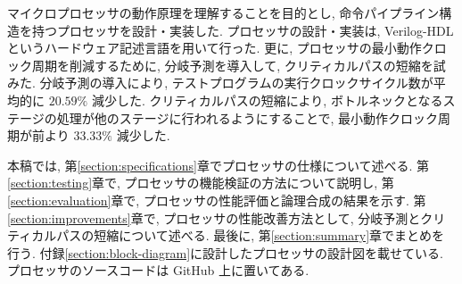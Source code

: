 \documentclass[../main.tex]{subfiles}
\begin{document}
  マイクロプロセッサの動作原理を理解することを目的とし, 
  命令パイプライン構造を持つプロセッサを設計・実装した.
  プロセッサの設計・実装は, Verilog-HDL というハードウェア記述言語を用いて行った.
  更に, プロセッサの最小動作クロック周期を削減するために, 
  分岐予測を導入して, クリティカルパスの短縮を試みた.
  分岐予測の導入により, テストプログラムの実行クロックサイクル数が平均的に $20.59\%$ 減少した.
  クリティカルパスの短縮により, 
  ボトルネックとなるステージの処理が他のステージに行われるようにすることで, 
  最小動作クロック周期が前より $33.33\%$ 減少した.

  本稿では, 第\ref{section:specifications}章でプロセッサの仕様について述べる.
  第\ref{section:testing}章で, プロセッサの機能検証の方法について説明し, 
  第\ref{section:evaluation}章で, プロセッサの性能評価と論理合成の結果を示す.
  第\ref{section:improvements}章で, プロセッサの性能改善方法として, 分岐予測とクリティカルパスの短縮について述べる.
  最後に, 第\ref{section:summary}章でまとめを行う.
  付録\ref{section:block-diagram}に設計したプロセッサの設計図を載せている.
  プロセッサのソースコードは GitHub \footnotemark 上に置いてある.
\end{document}
